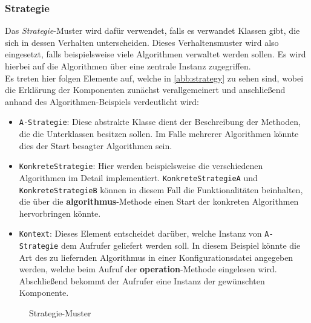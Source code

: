 \subsubsection{Strategie}
Das \textit{Strategie}-Muster wird dafür verwendet, falls es verwandet Klassen gibt, die sich in dessen Verhalten unterscheiden. Dieses Verhaltensmuster wird also eingesetzt, falls beispielsweise viele Algorithmen verwaltet werden sollen. Es wird hierbei auf die Algorithmen über eine zentrale Instanz zugegriffen.\\
Es treten hier folgen Elemente auf, welche in \autoref{abb:strategy} zu sehen sind, wobei die Erklärung der Komponenten zunächst verallgemeinert und anschließend anhand des Algorithmen-Beispiels verdeutlicht wird:
\begin{itemize}
\item \texttt{A-Strategie}: Diese abstrakte Klasse dient der Beschreibung der Methoden, die die Unterklassen besitzen sollen. Im Falle mehrerer Algorithmen könnte dies der Start besagter Algorithmen sein.
\item \texttt{KonkreteStrategie}: Hier werden beispielsweise die verschiedenen Algorithmen im Detail implementiert. \texttt{KonkreteStrategieA} und \texttt{KonkreteStrategieB} können in diesem Fall die Funktionalitäten beinhalten, die über die \textbf{algorithmus}-Methode einen Start der konkreten Algorithmen hervorbringen könnte.
\item \texttt{Kontext}: Dieses Element entscheidet darüber, welche Instanz von \texttt{A-Strategie} dem Aufrufer geliefert werden soll. In diesem Beispiel könnte die Art des zu liefernden Algorithmus in einer Konfigurationsdatei angegeben werden, welche beim Aufruf der \textbf{operation}-Methode eingelesen wird. Abschließend bekommt der Aufrufer eine Instanz der gewünschten Komponente.
\end{itemize}  

\begin{figure}[h]
\centering
{}
\caption{Strategie-Muster \cite{Goll.2014}}
\label{abb:strategy}
\end{figure}

